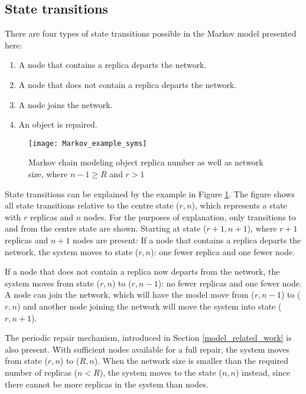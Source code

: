 \subsection{State transitions}

There are four types of state transitions possible in the Markov model presented here:
%
\begin{enumerate}
\item A node that contains a replica departs the network.
\item A node that does not contain a replica departs the network.
\item A node joins the network.
\item An object is repaired.
\end{enumerate}


\begin{figure}[htbp]
 \centering
 \texttt{[image: Markov\_example\_syms]}
 \caption{Markov chain modeling object replica number as well as network size, where $n-1\geqslant R$ and $r > 1$}
 \label{fig_markov_example_syms}
\end{figure}

State transitions can be explained by the example in Figure \ref{fig_markov_example_syms}. The figure shows all state transitions relative to the centre state ($r,n$), which represents a state with $r$ replicas and $n$ nodes. For the purposes of explanation, only transitions to and from the centre state are shown. Starting at state ($r+1,n+1$), where $r+1$ replicas and $n+1$ nodes are present: If a node that contains a replica departs the network, the system moves to state ($r,n$): one fewer replica and one fewer node.

If a node that does not contain a replica now departs from the network, the system moves from state ($r,n$) to ($r,n-1$): no fewer replicas and one fewer node. A node can join the network, which will have the model move from ($r,n-1$) to ($r,n$) and another node joining the network will move the system into state ($r,n+1$).

The periodic repair mechanism, introduced in Section \ref{model_related_work} is also present. With sufficient nodes available for a full repair, the system moves from state ($r,n$) to ($R,n$). When the network size is smaller than the required number of replicas ($n<R$), the system moves to the state ($n,n$) instead, since there cannot be more replicas in the system than nodes.


